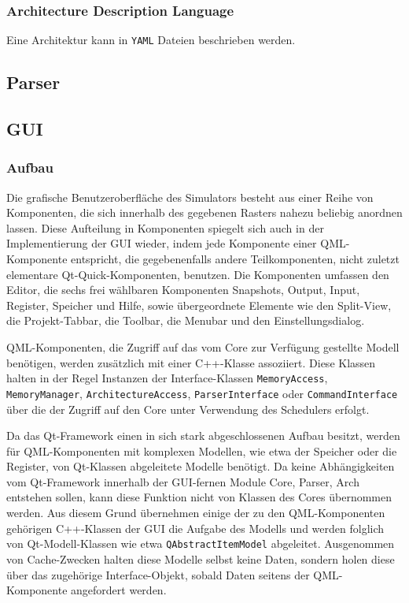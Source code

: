 \subsubsection{Architecture Description Language}

Eine Architektur kann in \texttt{YAML} Dateien beschrieben werden.




\subsection{Parser}



\subsection{GUI}


\subsubsection{Aufbau}

Die grafische Benutzeroberfläche des Simulators besteht aus einer Reihe von Komponenten, die sich innerhalb des gegebenen Rasters nahezu beliebig anordnen lassen. Diese Aufteilung in Komponenten spiegelt sich auch in der Implementierung der GUI wieder, indem jede Komponente einer QML-Komponente entspricht, die gegebenenfalls andere Teilkomponenten, nicht zuletzt elementare Qt-Quick-Komponenten, benutzen. Die Komponenten umfassen den Editor, die sechs frei wählbaren Komponenten Snapshots, Output, Input, Register, Speicher und Hilfe, sowie übergeordnete Elemente wie den Split-View, die Projekt-Tabbar, die Toolbar, die Menubar und den Einstellungsdialog.

QML-Komponenten, die Zugriff auf das vom Core zur Verfügung gestellte Modell benötigen, werden zusätzlich mit einer C++-Klasse assoziiert. Diese Klassen halten in der Regel Instanzen der Interface-Klassen \texttt{MemoryAccess}, \texttt{MemoryManager}, \texttt{ArchitectureAccess}, \texttt{ParserInterface} oder \texttt{CommandInterface}  über die der Zugriff auf den Core unter Verwendung des Schedulers erfolgt.

Da das Qt-Framework einen in sich stark abgeschlossenen Aufbau besitzt, werden für QML-Komponenten mit komplexen Modellen, wie etwa der Speicher oder die Register, von Qt-Klassen abgeleitete Modelle benötigt. Da keine Abhängigkeiten vom Qt-Framework innerhalb der GUI-fernen Module Core, Parser, Arch entstehen sollen, kann diese Funktion nicht von Klassen des Cores übernommen werden. Aus diesem Grund übernehmen einige der zu den QML-Komponenten gehörigen C++-Klassen der GUI die Aufgabe des Modells und werden folglich von Qt-Modell-Klassen wie etwa \texttt{QAbstractItemModel} abgeleitet. Ausgenommen von Cache-Zwecken halten diese Modelle selbst keine Daten, sondern holen diese über das zugehörige Interface-Objekt, sobald Daten seitens der QML-Komponente angefordert werden.

